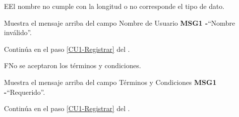 	\begin{UCtrayectoriaA}{E}{El nombre no cumple con la longitud o no corresponde el tipo de dato.}
	
		\UCpaso Muestra el mensaje arriba del campo Nombre de Usuario {\bf MSG1 -}``Nombre inválido''.
	
		\UCpaso Continúa en el paso \ref{CU1-Registrar} del .
	
\end{UCtrayectoriaA}

	\begin{UCtrayectoriaA}{F}{No se aceptaron los términos y condiciones.}
	
		\UCpaso Muestra el mensaje arriba del campo Términos y Condiciones {\bf MSG1 -}``Requerido''.
	
	\UCpaso Continúa en el paso \ref{CU1-Registrar} del .
	
	\end{UCtrayectoriaA}


		
		